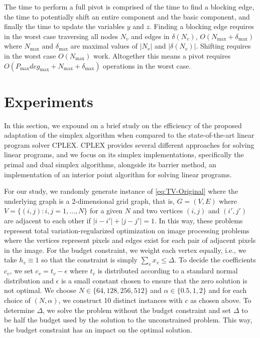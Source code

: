 \documentclass[titlepage,11pt]{article}
\begin{document}
The time to perform a full pivot is comprised of the time to find a blocking edge, the time to potentially shift an entire component and the basic component, and finally the time to update the variables $y$ and $z$. Finding a blocking edge requires in the worst case traversing all nodes $N_v$ and edges in $\delta(N_v)$, $O(N_{\max} + \delta_{\max})$ where $N_{\max}$ and $\delta_{\max}$ are maximal values of $|N_v|$ and $|\delta(N_v)|$. Shifting requires in the worst case $O(N_{\max})$ work. Altogether this means a pivot requires $O(P_{\max}deg_{\max} + N_{\max} + \delta_{\max})$ operations in the worst case.

\section{Experiments}\label{sec:experiments}

In this section, we expound on a brief study on the efficiency of the proposed adaptation of the simplex algorithm when compared to the state-of-the-art linear program solver CPLEX. CPLEX provides several different approaches for solving linear programs, and we focus on its simplex implementations, specifically the primal and dual simplex algorithms, alongside its barrier method, an implementation of an interior point algorithm for solving linear programs.

For our study, we randomly generate instance of \eqref{eq:TV-Original} where the underlying graph is a 2-dimensional grid graph, that is, $G = (V, E)$ where $V = \{(i, j) : i, j=1,\ldots,N\}$ for a given $N$ and two vertices $(i, j)$ and $(i', j')$ are adjacent to each other if $|i - i'| + |j - j'| = 1$. In this way, these problems represent total variation-regularized optimization on image processing problems where the vertices represent pixels and edges exist for each pair of adjacent pixels in the image. For the budget constraint, we weight each vertex equally, i.e., we take $h_v \equiv 1$ so that the constraint is simply $\sum_v x_v \le \Delta$. To decide the coefficients $c_v$, we set $c_v = t_v - \epsilon$ where $t_v$ is distributed according to a standard normal distribution and $\epsilon$ is a small constant chosen to ensure that the zero solution is not optimal. 
We choose $N \in \{64, 128, 256, 512\}$ and $\alpha \in \{0.5, 1, 2\}$ and for each choice of $(N, \alpha)$, we construct 10 distinct instances with $c$ as chosen above. To determine $\Delta$, we solve the problem without the budget constraint and set $\Delta$ to be half the budget used by the solution to the unconstrained problem. This way, the budget constraint has an impact on the optimal solution.
\end{document}
